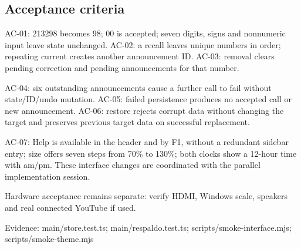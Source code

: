 \subsection{Acceptance criteria}

AC-01: 213298 becomes 98; 00 is accepted; seven digits, signs and nonnumeric input leave state unchanged. AC-02: a recall leaves unique numbers in order; repeating current creates another announcement ID. AC-03: removal clears pending correction and pending announcements for that number.

AC-04: six outstanding announcements cause a further call to fail without state/ID/undo mutation. AC-05: failed persistence produces no accepted call or new announcement. AC-06: restore rejects corrupt data without changing the target and preserves previous target data on successful replacement.

AC-07: Help is available in the header and by F1, without a redundant sidebar entry; size offers seven steps from 70\% to 130\%; both clocks show a 12-hour time with am/pm. These interface changes are coordinated with the parallel implementation session.

Hardware acceptance remains separate: verify HDMI, Windows scale, speakers and real connected YouTube if used.

Evidence: main/store.test.ts; main/respaldo.test.ts; scripts/smoke-interface.mjs; scripts/smoke-theme.mjs
